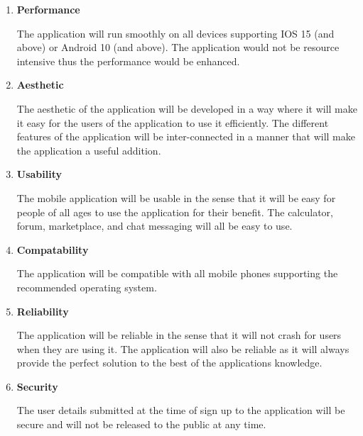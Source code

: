 \documentclass{article}
\begin{document}
\begin{enumerate}

    \item \textbf{Performance}

          The application will run smoothly on all devices supporting IOS 15 (and above)
          or Android 10 (and above). The application would not be resource intensive thus
          the performance would be enhanced.

    \item \textbf{Aesthetic}

          The aesthetic of the application will be developed in a way where it will make
          it easy for the users of the application to use it efficiently. The different
          features of the application will be inter-connected in a manner that will make
          the application a useful addition.

    \item \textbf{Usability}

          The mobile application will be usable in the sense that it will be easy for
          people of all ages to use the application for their benefit. The calculator,
          forum, marketplace, and chat messaging will all be easy to use.

    \item \textbf{Compatability}

          The application will be compatible with all mobile phones supporting the
          recommended operating system.

    \item \textbf{Reliability}

          The application will be reliable in the sense that it will not crash for users
          when they are using it. The application will also be reliable as it will always
          provide the perfect solution to the best of the applications knowledge.

    \item \textbf{Security}

          The user details submitted at the time of sign up to the application will be
          secure and will not be released to the public at any time.

\end{enumerate}
\end{document}
